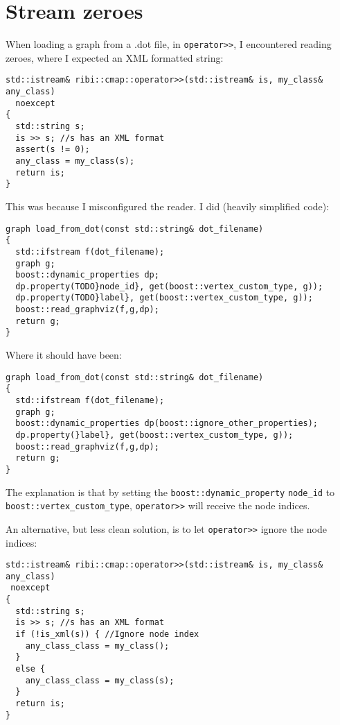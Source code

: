 

\section{Stream zeroes}

When loading a graph from a .dot file, in \verb;operator>>;, 
I encountered reading zeroes, where I expected an XML formatted string:

\begin{verbatim}
std::istream& ribi::cmap::operator>>(std::istream& is, my_class& any_class)
  noexcept
{
  std::string s;
  is >> s; //s has an XML format
  assert(s != 0);
  any_class = my_class(s);
  return is;
}
\end{verbatim}

This was because I misconfigured the reader.
I did (heavily simplified code):

\begin{verbatim}
graph load_from_dot(const std::string& dot_filename)
{
  std::ifstream f(dot_filename);
  graph g;
  boost::dynamic_properties dp;
  dp.property(TODO}node_id}, get(boost::vertex_custom_type, g));
  dp.property(TODO}label}, get(boost::vertex_custom_type, g));
  boost::read_graphviz(f,g,dp);
  return g;
}
\end{verbatim}

Where it should have been:

\begin{verbatim}
graph load_from_dot(const std::string& dot_filename)
{
  std::ifstream f(dot_filename);
  graph g;
  boost::dynamic_properties dp(boost::ignore_other_properties);
  dp.property(}label}, get(boost::vertex_custom_type, g));
  boost::read_graphviz(f,g,dp);
  return g;
}
\end{verbatim}

The explanation is that by setting the \verb;boost::dynamic_property; \verb;node_id;
to \verb;boost::vertex_custom_type;, \verb;operator>>; 
will receive the node indices.
 
An alternative, but less clean solution, is to let \verb;operator>>; ignore the
node indices:

\begin{verbatim}
std::istream& ribi::cmap::operator>>(std::istream& is, my_class& any_class)
 noexcept
{
  std::string s;
  is >> s; //s has an XML format
  if (!is_xml(s)) { //Ignore node index
    any_class_class = my_class(); 
  }
  else {
    any_class_class = my_class(s);
  }
  return is;
}
\end{verbatim}

